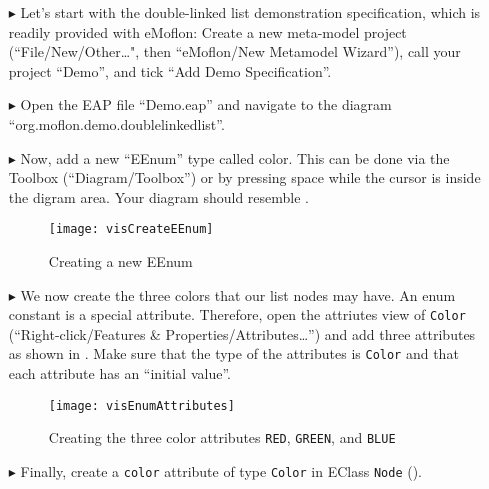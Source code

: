 \genHeader

\begin{itemize}

\item[$\blacktriangleright$]
Let's start with the double-linked list demonstration specification, which is
readily provided with eMoflon:
Create a new meta-model project (``File/New/Other\dots", then ``eMoflon/New
Metamodel Wizard''), call your project ``Demo'', and tick ``Add Demo
Specification''.

\item[$\blacktriangleright$]
Open the EAP file ``Demo.eap'' and navigate to the diagram
``org.\-moflon.\-demo.\-doublelinkedlist''.

\item[$\blacktriangleright$]
Now, add a new ``EEnum'' type called color.
This can be done via the Toolbox (``Diagram/Toolbox'') or by pressing space
while the cursor is inside the digram area.
Your diagram should resemble .

\begin{figure}[htbp]
    \begin{center} 
        \texttt{[image: visCreateEEnum]}
        \caption{Creating a new EEnum}  
        \label{enums:vis:createEEnum}
    \end{center}
\end{figure}

\item[$\blacktriangleright$]
We now create the three colors that our list nodes may have.
An enum constant is a special attribute.
Therefore, open the attriutes view of \texttt{Color} (``Right-click/Features \&
Properties/Attributes\dots'') and add three attributes as shown in
.
Make sure that the type of the attributes is \texttt{Color} and that each
attribute has an ``initial value''.

\begin{figure}[htbp]
    \begin{center} 
        \texttt{[image: visEnumAttributes]}
        \caption{Creating the three color attributes \texttt{RED},
        \texttt{GREEN}, and \texttt{BLUE}}
        \label{enums:vis:enumAttributes}
    \end{center}
\end{figure}

\item[$\blacktriangleright$]
Finally, create a \texttt{color} attribute of type \texttt{Color} in EClass
\texttt{Node} ().



\end{itemize}
